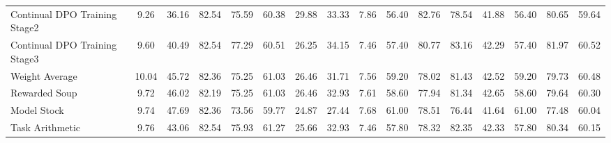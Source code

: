 \begin{table*}
{\begin{tabular}{lcccccccc|c|cc|cccc}
            Continual DPO Training Stage2     & 9.26                                      & 36.16            & 82.54                                      & 75.59                                  & 60.38                                 & 29.88                                   & 33.33                         & 7.86     & 56.40           & 82.76           & 78.54       & 41.88 & 56.40 & 80.65 & 59.64             \\
            Continual DPO Training Stage3     & 9.60                                      & 40.49            & 82.54                                      & 77.29                                  & 60.51                                 & 26.25                                   & 34.15                         & 7.46     & 57.40           & 80.77           & 83.16       & 42.29 & 57.40 & 81.97 & 60.52             \\ \midrule
            Weight Average                    & 10.04                                     & 45.72            & 82.36                                      & 75.25                                  & 61.03                                 & 26.46                                   & 31.71                         & 7.56     & 59.20           & 78.02           & 81.43       & 42.52 & 59.20 & 79.73 & 60.48             \\
            Rewarded Soup                     & 9.72                                      & 46.02            & 82.19                                      & 75.25                                  & 61.03                                 & 26.46                                   & 32.93                         & 7.61     & 58.60           & 77.94           & 81.34       & 42.65 & 58.60 & 79.64 & 60.30             \\
            Model Stock                       & 9.74                                      & 47.69            & 82.36                                      & 73.56                                  & 59.77                                 & 24.87                                   & 27.44                         & 7.68     & 61.00           & 78.51           & 76.44       & 41.64 & 61.00 & 77.48 & 60.04             \\
            Task Arithmetic                   & 9.76                                      & 43.06            & 82.54                                      & 75.93                                  & 61.27                                 & 25.66                                   & 32.93                         & 7.46     & 57.80           & 78.32           & 82.35       & 42.33 & 57.80 & 80.34 & 60.15             \\

\end{tabular}}
\end{table*}
